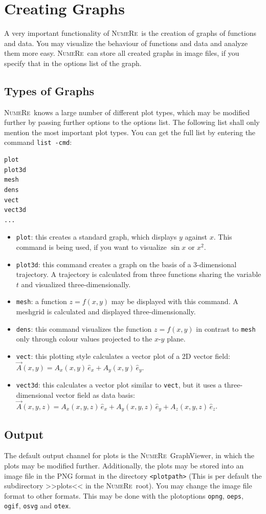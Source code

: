 \documentclass[DIV=14,headsepline,footsepline]{scrbook}
\newcommand{\NR}{\textsc{Nu\-me\-Re}}
\begin{document}
		\chapter{Creating Graphs}
			A very important functionality of \NR\ is the creation of graphs of functions and data. You may visualize the behaviour of functions and data and analyze them more easy. \NR\ can store all created graphs in image files, if you specify that in the options list of the graph.
			\section{Types of Graphs}
				\NR\ knows a large number of different plot types, which may be modified further by passing further options to the options list. The following list shall only mention the most important plot types. You can get the full list by entering the command \lstinline+list -cmd+:
				\begin{lstlisting}
plot
plot3d
mesh
dens
vect
vect3d
...
				\end{lstlisting}
				\begin{itemize}
					\item \lstinline+plot+: this creates a standard graph, which displays $y$ against $x$. This command is being used, if you want to visualize $\sin x$ or $x^2$.
					\item \lstinline+plot3d+: this command creates a graph on the basis of a 3-dimensional trajectory. A trajectory is calculated from three functions sharing the variable $t$ and visualized three-di\-men\-sion\-al\-ly.
					\item \lstinline+mesh+: a function $z = f(x,y)$ may be displayed with this command. A meshgrid is calculated and displayed three-dimensionally.
					\item \lstinline+dens+: this command visualizes the function $z = f(x,y)$ in contrast to \lstinline+mesh+ only through colour values projected to the $x$-$y$ plane.
					\item \lstinline+vect+: this plotting style calculates a vector plot of a 2D vector field: $\vec A(x,y) = A_x(x,y)\,\hat e_x + A_y(x,y)\,\hat e_y$.
					\item \lstinline+vect3d+: this calculates a vector plot similar to \lstinline+vect+, but it uses a three-dimensional vector field as data basis: $\vec A(x,y,z) = A_x(x,y,z)\,\hat e_x + A_y(x,y,z)\,\hat e_y + A_z(x,y,z)\,\hat e_z$.
				\end{itemize}
			\section{Output}
				The default output channel for plots is the \NR\ GraphViewer, in which the plots may be modified further. Additionally, the plots may be stored into an image file in the PNG format in the directory \verb+<plotpath>+ (This is per default the subdirectory >>plots<< in the \NR\ root). You may change the image file format to other formats. This may be done with the plotoptions \lstinline+opng+, \lstinline+oeps+, \lstinline+ogif+, \lstinline+osvg+ and \lstinline+otex+.
				
\end{document}
